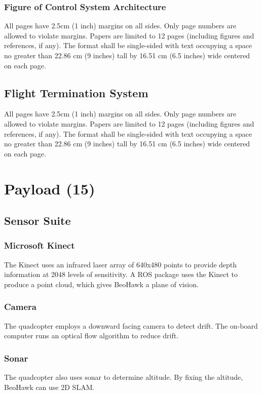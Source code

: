 \documentclass[12pt, letterpaper]{article}
\begin{document}
\subsubsection{Figure of Control System Architecture}
All pages have 2.5cm (1 inch) margins on all sides. Only page numbers are allowed to violate margins. Papers are limited to 12 pages (including figures and references, if any). The format shall be single-sided with text occupying a space no greater than 22.86 cm (9 inches) tall by 16.51 cm (6.5 inches) wide centered on each page.

\subsection{Flight Termination System}
All pages have 2.5cm (1 inch) margins on all sides. Only page numbers are allowed to violate margins. Papers are limited to 12 pages (including figures and references, if any). The format shall be single-sided with text occupying a space no greater than 22.86 cm (9 inches) tall by 16.51 cm (6.5 inches) wide centered on each page.


\section{Payload (15)}
\subsection{Sensor Suite}
\subsubsection{Microsoft Kinect}
The Kinect uses an infrared laser array of 640x480 points to provide depth information at 2048 levels of sensitivity. A ROS package uses the Kinect to produce a point cloud, which gives BeoHawk a plane of vision.

\subsubsection{Camera}
The quadcopter employs a downward facing camera to detect drift. The on-board computer runs an optical flow algorithm to reduce drift. 

\subsubsection{Sonar}
The quadcopter also uses sonar to determine altitude. By fixing the altitude, BeoHawk can use 2D SLAM. 
\end{document}
